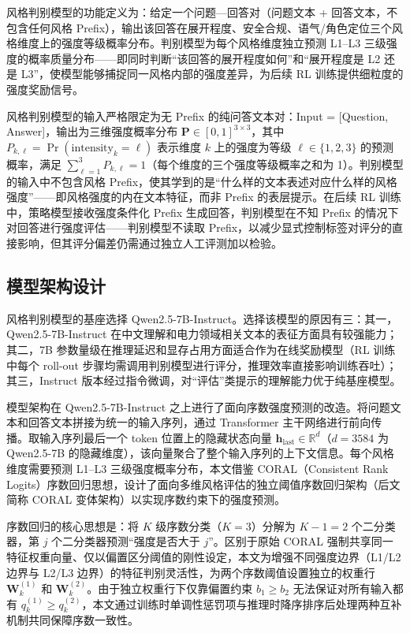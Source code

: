 \documentclass[fontset=fandol,type=master,campus=shenzhen,etitleauto=true]{hithesisbook}
\begin{document}
风格判别模型的功能定义为：给定一个问题---回答对（问题文本 + 回答文本，不包含任何风格 Prefix），输出该回答在展开程度、安全合规、语气/角色定位三个风格维度上的强度等级概率分布。判别模型为每个风格维度独立预测 L1--L3 三级强度的概率质量分布------即同时判断``该回答的展开程度如何''和``展开程度是 L2 还是 L3''，使模型能够捕捉同一风格内部的强度差异，为后续 RL 训练提供细粒度的强度奖励信号。

风格判别模型的输入严格限定为无 Prefix 的纯问答文本对：Input = {[}Question, Answer{]}，输出为三维强度概率分布 $\mathbf{P} \in [0,1]^{3 \times 3}$，其中 $P_{k,\ell} = \Pr(\text{intensity}_k = \ell)$ 表示维度 $k$ 上的强度为等级 $\ell \in \{1,2,3\}$ 的预测概率，满足 $\sum_{\ell=1}^{3} P_{k,\ell} = 1$（每个维度的三个强度等级概率之和为 1）。判别模型的输入中不包含风格 Prefix，使其学到的是``什么样的文本表述对应什么样的风格强度''------即风格强度的内在文本特征，而非 Prefix 的表层提示。在后续 RL 训练中，策略模型接收强度条件化 Prefix 生成回答，判别模型在不知 Prefix 的情况下对回答进行强度评估------判别模型不读取 Prefix，以减少显式控制标签对评分的直接影响，但其评分偏差仍需通过独立人工评测加以检验。

\subsection{模型架构设计}\label{ux6a21ux578bux67b6ux6784ux8bbeux8ba1}

风格判别模型的基座选择 Qwen2.5-7B-Instruct。选择该模型的原因有三：其一，Qwen2.5-7B-Instruct 在中文理解和电力领域相关文本的表征方面具有较强能力；其二，7B 参数量级在推理延迟和显存占用方面适合作为在线奖励模型（RL 训练中每个 roll-out 步骤均需调用判别模型进行评分，推理效率直接影响训练吞吐）；其三，Instruct 版本经过指令微调，对``评估''类提示的理解能力优于纯基座模型。

模型架构在 Qwen2.5-7B-Instruct 之上进行了面向序数强度预测的改造。将问题文本和回答文本拼接为统一的输入序列，通过 Transformer 主干网络进行前向传播。取输入序列最后一个 token 位置上的隐藏状态向量 $\mathbf{h}_{\text{last}} \in \mathbb{R}^{d}$（$d = 3584$ 为 Qwen2.5-7B 的隐藏维度），该向量聚合了整个输入序列的上下文信息。每个风格维度需要预测 L1--L3 三级强度概率分布，本文借鉴 CORAL（Consistent Rank Logits）序数回归思想，设计了面向多维风格评估的独立阈值序数回归架构（后文简称 CORAL 变体架构）以实现序数约束下的强度预测。

序数回归的核心思想是：将 $K$ 级序数分类（$K=3$）分解为 $K-1=2$ 个二分类器，第 $j$ 个二分类器预测``强度是否大于 $j$''。区别于原始 CORAL 强制共享同一特征权重向量、仅以偏置区分阈值的刚性设定，本文为增强不同强度边界（L1/L2 边界与 L2/L3 边界）的特征判别灵活性，为两个序数阈值设置独立的权重行 $\mathbf{W}_k^{(1)}$ 和 $\mathbf{W}_k^{(2)}$。由于独立权重行下仅靠偏置约束 $b_1 \geq b_2$ 无法保证对所有输入都有 $q_k^{(1)} \geq q_k^{(2)}$，本文通过训练时单调性惩罚项与推理时降序排序后处理两种互补机制共同保障序数一致性。
\end{document}
